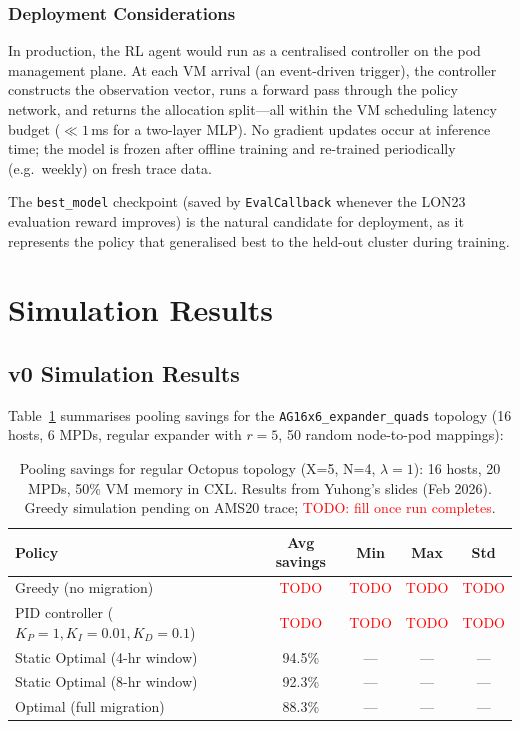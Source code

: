 \documentclass[11pt]{article}
\newcommand{\red}[1]{\textcolor{red}{#1}}
\begin{document}
\subsubsection*{Deployment Considerations}

In production, the RL agent would run as a centralised controller on the
pod management plane.  At each VM arrival (an event-driven trigger), the
controller constructs the observation vector, runs a forward pass through
the policy network, and returns the allocation split---all within the VM
scheduling latency budget ($\ll 1$\,ms for a two-layer MLP).  No gradient
updates occur at inference time; the model is frozen after offline training
and re-trained periodically (e.g.\ weekly) on fresh trace data.

The \texttt{best\_model} checkpoint (saved by \texttt{EvalCallback} whenever
the LON23 evaluation reward improves) is the natural candidate for
deployment, as it represents the policy that generalised best to the
held-out cluster during training.

\section{Simulation Results}



\subsection{v0 Simulation Results}

Table~\ref{tab:greedy_vs_opt} summarises pooling savings for the
\texttt{AG16x6\_expander\_quads} topology (16 hosts, 6 MPDs, regular
expander with $r = 5$, 50 random node-to-pod mappings):

\begin{table}[H]
\centering
\small
\begin{tabular}{lcccc}
\toprule
\textbf{Policy} & \textbf{Avg savings} & \textbf{Min} & \textbf{Max} & \textbf{Std} \\
\midrule
Greedy (no migration)          & \red{TODO} & \red{TODO} & \red{TODO} & \red{TODO} \\
PID controller ($K_P{=}1, K_I{=}0.01, K_D{=}0.1$) & \red{TODO} & \red{TODO} & \red{TODO} & \red{TODO} \\
Static Optimal (4-hr window)   & 94.5\%     & ---        & ---        & ---        \\
Static Optimal (8-hr window)   & 92.3\%     & ---        & ---        & ---        \\
Optimal (full migration)       & 88.3\%     & ---        & ---        & ---        \\
\bottomrule
\end{tabular}
\caption{Pooling savings for regular Octopus topology (X=5, N=4, $\lambda=1$):
16 hosts, 20 MPDs, 50\% VM memory in CXL\@.
Results from Yuhong's slides (Feb 2026).
Greedy simulation pending on AMS20 trace; \red{TODO: fill once run completes}.}
\label{tab:greedy_vs_opt}
\end{table}
\end{document}
